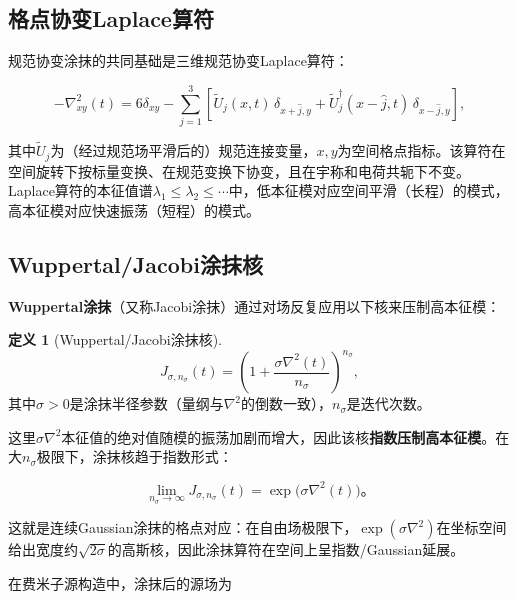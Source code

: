\documentclass[12pt,a4paper]{ctexart}
\theoremstyle{definition}
\newtheorem{definition}{定义}[section]
\begin{document}
\subsection{格点协变Laplace算符}

规范协变涂抹的共同基础是三维规范协变Laplace算符\cite{UKQCD1993,Peardon2009}：

\begin{equation}
-\nabla^2_{xy}(t) = 6\delta_{xy} - \sum_{j=1}^{3} \left[\tilde{U}_j(x,t)\,\delta_{x+\hat{j},y} + \tilde{U}^\dagger_j(x-\hat{j},t)\,\delta_{x-\hat{j},y}\right],
\label{eq:laplacian}
\end{equation}

其中$\tilde{U}_j$为（经过规范场平滑后的）规范连接变量，$x, y$为空间格点指标。该算符在空间旋转下按标量变换、在规范变换下协变，且在宇称和电荷共轭下不变\cite{Peardon2009}。Laplace算符的本征值谱$\lambda_1 \le \lambda_2 \le \cdots$中，低本征模对应空间平滑（长程）的模式，高本征模对应快速振荡（短程）的模式。

\subsection{Wuppertal/Jacobi涂抹核}

\textbf{Wuppertal涂抹}（又称Jacobi涂抹）通过对场反复应用以下核来压制高本征模\cite{UKQCD1993,NoteGluonPDFs}：

\begin{definition}[Wuppertal/Jacobi涂抹核]
\begin{equation}
\boxed{J_{\sigma, n_\sigma}(t) = \left(1 + \frac{\sigma\nabla^2(t)}{n_\sigma}\right)^{n_\sigma}},
\label{eq:jacobi_kernel}
\end{equation}
其中$\sigma > 0$是涂抹半径参数（量纲与$\nabla^2$的倒数一致），$n_\sigma$是迭代次数。
\end{definition}

这里$\sigma\nabla^2$本征值的绝对值随模的振荡加剧而增大，因此该核\textbf{指数压制高本征模}。在大$n_\sigma$极限下，涂抹核趋于指数形式\cite{NoteGluonPDFs,Peardon2009}：

\begin{equation}
\lim_{n_\sigma \to \infty} J_{\sigma, n_\sigma}(t) = \exp\!\big(\sigma\nabla^2(t)\big)。
\label{eq:jacobi_limit}
\end{equation}

这就是连续Gaussian涂抹的格点对应：在自由场极限下，$\exp(\sigma\nabla^2)$在坐标空间给出宽度约$\sqrt{2\sigma}$的高斯核，因此涂抹算符在空间上呈指数/Gaussian延展。

在费米子源构造中，涂抹后的源场为
\end{document}
